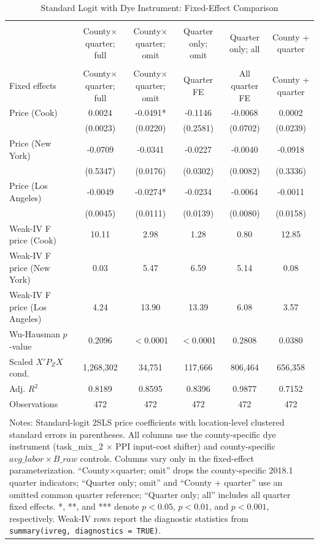 \begin{table}[!htbp] \centering
  \caption{Standard Logit with Dye Instrument: Fixed-Effect Comparison}
  \label{tab:standard_dye_fe_comparison}
  \begin{tabular}{lccccc}
\\[-1.8ex]\hline
\hline \\[-1.8ex]
 & County$\times$quarter; full & County$\times$quarter; omit & Quarter only; omit & Quarter only; all & County + quarter \\
\hline \\[-1.8ex]
Fixed effects & County$\times$quarter; full & County$\times$quarter; omit & Quarter FE & All quarter FE & County + quarter \\
Price (Cook) & 0.0024 & -0.0491* & -0.1146 & -0.0068 & 0.0002 \\
 & (0.0023) & (0.0220) & (0.2581) & (0.0702) & (0.0239) \\
Price (New York) & -0.0709 & -0.0341 & -0.0227 & -0.0040 & -0.0918 \\
 & (0.5347) & (0.0176) & (0.0302) & (0.0082) & (0.3336) \\
Price (Los Angeles) & -0.0049 & -0.0274* & -0.0234 & -0.0064 & -0.0011 \\
 & (0.0045) & (0.0111) & (0.0139) & (0.0080) & (0.0158) \\
Weak-IV F price (Cook) & 10.11 & 2.98 & 1.28 & 0.80 & 12.85 \\
Weak-IV F price (New York) & 0.03 & 5.47 & 6.59 & 5.14 & 0.08 \\
Weak-IV F price (Los Angeles) & 4.24 & 13.90 & 13.39 & 6.08 & 3.57 \\
Wu-Hausman $p$-value & 0.2096 & $<$0.0001 & $<$0.0001 & 0.2808 & 0.0380 \\
Scaled $X'P_ZX$ cond. & 1,268,302 & 34,751 & 117,666 & 806,464 & 656,358 \\
Adj. $R^2$ & 0.8189 & 0.8595 & 0.8396 & 0.9877 & 0.7152 \\
Observations & 472 & 472 & 472 & 472 & 472 \\
\hline \\[-1.8ex]
\multicolumn{6}{p{0.92\linewidth}}{\footnotesize Notes: Standard-logit 2SLS price coefficients with location-level clustered standard errors in parentheses. All columns use the county-specific dye instrument (task\_mix\_2 $\times$ PPI input-cost shifter) and county-specific $avg\_labor \times B\_raw$ controls. Columns vary only in the fixed-effect parameterization. ``County$\times$quarter; omit'' drops the county-specific 2018.1 quarter indicators; ``Quarter only; omit'' and ``County + quarter'' use an omitted common quarter reference; ``Quarter only; all'' includes all quarter fixed effects. *, **, and *** denote $p<0.05$, $p<0.01$, and $p<0.001$, respectively. Weak-IV rows report the diagnostic statistics from \texttt{summary(ivreg, diagnostics = TRUE)}.}\\
\end{tabular}
\end{table}
